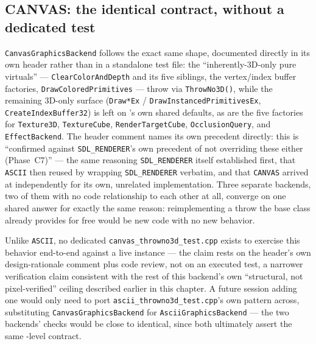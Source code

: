 \subsection{CANVAS: the identical contract, without a dedicated test}

\texttt{CanvasGraphicsBackend} follows the exact same shape, documented directly in its own
header rather than in a standalone test file: the ``inherently-3D-only pure virtuals'' ---
\texttt{ClearColorAnd\allowbreak{}Depth} and its five siblings, the vertex/index buffer factories,
\texttt{DrawColoredPrimitives} --- throw via \texttt{ThrowNo3D()}, while the remaining
3D-only surface (\texttt{Draw*Ex} / \texttt{DrawInstanced\allowbreak{}PrimitivesEx},
\texttt{CreateIndex\allowbreak{}Buffer32}) is left on
's own shared defaults, as are the five factories for
\texttt{Texture3D}, \texttt{TextureCube}, \texttt{RenderTargetCube},
\texttt{OcclusionQuery}, and \texttt{EffectBackend}. The header comment names its own
precedent directly: this is ``confirmed against \texttt{SDL\_RENDERER}'s own precedent of
not overriding these either (Phase~C7)'' --- the same reasoning \texttt{SDL\_RENDERER} itself
established first, that \texttt{ASCII} then reused by wrapping \texttt{SDL\_RENDERER}
verbatim, and that \texttt{CANVAS} arrived at independently for its own, unrelated
implementation. Three separate backends, two of them with no code relationship to each other
at all, converge on one shared answer for exactly the same reason: reimplementing a throw the
base class already provides for free would be new code with no new behavior.

Unlike \texttt{ASCII}, no dedicated \texttt{canvas\_throwno3d\_test.cpp} exists to exercise
this behavior end-to-end against a live instance --- the claim rests on the header's own
design-rationale comment plus code review, not on an executed test, a narrower verification
claim consistent with the rest of this backend's own ``structural, not pixel-verified''
ceiling described earlier in this chapter. A future session adding one would only need to
port \texttt{ascii\_throwno3d\_test.cpp}'s own pattern across, substituting
\texttt{CanvasGraphicsBackend} for \texttt{AsciiGraphicsBackend} --- the two backends' checks
would be close to identical, since both ultimately assert the same
-level contract.
